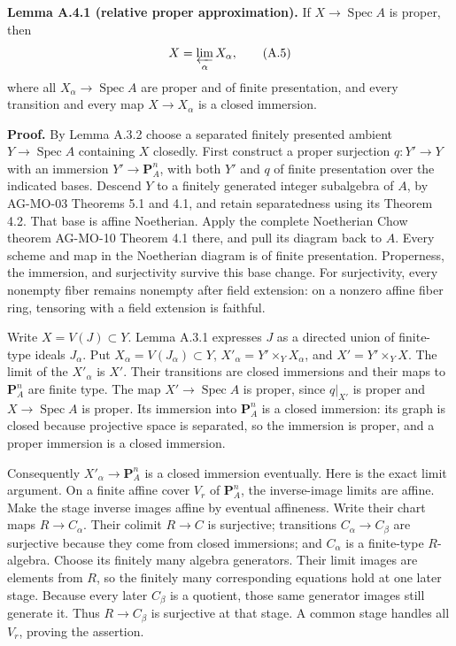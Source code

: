 \documentclass[11pt]{article}
\begin{document}
\textbf{Lemma A.4.1 (relative proper approximation).} If
\(X\to\operatorname{Spec}A\) is proper, then \[
X=\varprojlim_\alpha X_\alpha,
\tag{A.5}
\] where all \(X_\alpha\to\operatorname{Spec}A\) are proper and of
finite presentation, and every transition and every map
\(X\to X_\alpha\) is a closed immersion.

\textbf{Proof.} By Lemma A.3.2 choose a separated finitely presented
ambient \(Y\to\operatorname{Spec}A\) containing \(X\) closedly. First
construct a proper surjection \(q:Y'\to Y\) with an immersion
\(Y'\to\mathbf P^n_A\), with both \(Y'\) and \(q\) of finite
presentation over the indicated bases. Descend \(Y\) to a finitely
generated integer subalgebra of \(A\), by AG-MO-03 Theorems 5.1 and 4.1,
and retain separatedness using its Theorem 4.2. That base is affine
Noetherian. Apply the complete Noetherian Chow theorem AG-MO-10 Theorem
4.1 there, and pull its diagram back to \(A\). Every scheme and map in
the Noetherian diagram is of finite presentation. Properness, the
immersion, and surjectivity survive this base change. For surjectivity,
every nonempty fiber remains nonempty after field extension: on a
nonzero affine fiber ring, tensoring with a field extension is faithful.

Write \(X=V(J)\subset Y\). Lemma A.3.1 expresses \(J\) as a directed
union of finite-type ideals \(J_\alpha\). Put
\(X_\alpha=V(J_\alpha)\subset Y\), \(X'_\alpha=Y'\times_Y X_\alpha\),
and \(X'=Y'\times_Y X\). The limit of the \(X'_\alpha\) is \(X'\). Their
transitions are closed immersions and their maps to \(\mathbf P^n_A\)
are finite type. The map \(X'\to\operatorname{Spec}A\) is proper, since
\(q|_{X'}\) is proper and \(X\to\operatorname{Spec}A\) is proper. Its
immersion into \(\mathbf P^n_A\) is a closed immersion: its graph is
closed because projective space is separated, so the immersion is
proper, and a proper immersion is a closed immersion.

Consequently \(X'_\alpha\to\mathbf P^n_A\) is a closed immersion
eventually. Here is the exact limit argument. On a finite affine cover
\(V_r\) of \(\mathbf P^n_A\), the inverse-image limits are affine. Make
the stage inverse images affine by eventual affineness. Write their
chart maps \(R\to C_\alpha\). Their colimit \(R\to C\) is surjective;
transitions \(C_\alpha\to C_\beta\) are surjective because they come
from closed immersions; and \(C_\alpha\) is a finite-type \(R\)-algebra.
Choose its finitely many algebra generators. Their limit images are
elements from \(R\), so the finitely many corresponding equations hold
at one later stage. Because every later \(C_\beta\) is a quotient, those
same generator images still generate it. Thus \(R\to C_\beta\) is
surjective at that stage. A common stage handles all \(V_r\), proving
the assertion.
\end{document}
